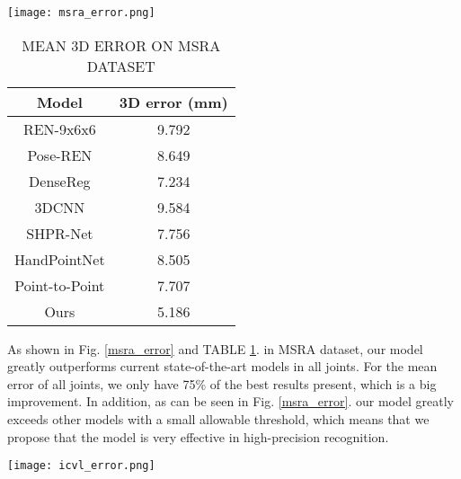 \documentclass[journal]{IEEEtran}
\begin{document}
\begin{figure*}[!t]
  \centering
  \texttt{[image: msra\_error.png]}
  \caption{
    The results of MSRA dataset. 
    Left is mean error (mm) for each joint. 
    Right is the proportion of frame that all joints error are under the given threshold.
  }
  \label{msra_error}
\end{figure*}

\begin{table}[!t]
\renewcommand{\arraystretch}{1.3}
  \caption{MEAN 3D ERROR ON MSRA DATASET}
  \label{msra_table}
  \centering
    \begin{tabular}{c c}
    \toprule
    Model & 3D error (mm)\\
    \hline
    REN-9x6x6\cite{wang2018region} & 9.792\\
    Pose-REN\cite{chen2017pose} & 8.649\\
    DenseReg\cite{wan2018dense} & 7.234\\
    3DCNN\cite{ge20173d} & 9.584\\
    SHPR-Net\cite{chen2018shpr} & 7.756\\
    HandPointNet\cite{ge2018hand} & 8.505\\
    Point-to-Point\cite{ge2018point} & 7.707\\
    \hline
    Ours & 5.186\\
    \bottomrule
    \end{tabular}
\end{table}

As shown in Fig\@. \ref{msra_error} and TABLE \ref{msra_table}. 
in MSRA dataset, our model greatly outperforms current state-of-the-art models in all joints. 
For the mean error of all joints, we only have 75\% of the best results present\cite{wan2018dense}, which is a big improvement. 
In addition, as can be seen in Fig\@. \ref{msra_error}.  our model greatly exceeds other models with a small allowable threshold, 
which means that we propose that the model is very effective in high-precision recognition.

\begin{figure*}[!t]
  \centering
  \texttt{[image: icvl\_error.png]}
  \caption{
    The results of ICVL dataset. 
    Left is mean error (mm) for each joint. 
    Right is the proportion of frame that all joints error are under the given threshold.
  }
  \label{icvl_error}
\end{figure*}
\end{document}
